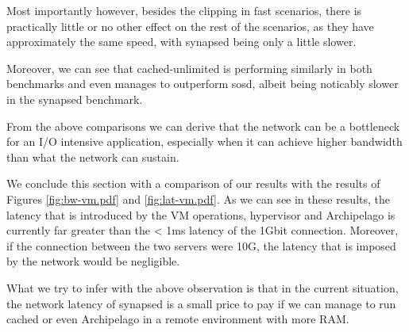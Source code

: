 Most importantly however, besides the clipping in fast scenarios, there is 
practically little or no other effect on the rest of the scenarios, as they 
have approximately the same speed, with synapsed being only a little slower.

Moreover, we can see that cached-unlimited is performing similarly in both 
benchmarks and even manages to outperform sosd, albeit being noticably slower 
in the synapsed benchmark.

From the above comparisons we can derive that the network can be a bottleneck 
for an I/O intensive application, especially when it can achieve higher 
bandwidth than what the network can sustain.

We conclude this section with a comparison of our results with the results of 
Figures \ref{fig:bw-vm.pdf} and \ref{fig:lat-vm.pdf}. As we can see in these 
results, the latency that is introduced by the VM operations, hypervisor and 
Archipelago is currently far greater than the < 1ms latency of the 1Gbit 
connection. Moreover, if the connection between the two servers were 10G, the 
latency that is imposed by the network would be negligible.

What we try to infer with the above observation is that in the current 
situation, the network latency of synapsed is a small price to pay if we can 
manage to run cached or even Archipelago in a remote environment with more RAM.
